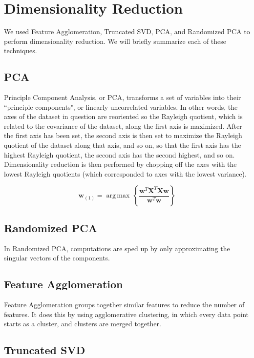 \documentclass[12pt]{article}
\begin{document}
\section{Dimensionality Reduction}

We used Feature Agglomeration, Truncated SVD, PCA, and Randomized PCA to
perform dimensionality reduction. We will briefly summarize each of these
techniques.

\subsection{PCA}

Principle Component Analysis, or PCA, transforms a set of variables into their
``principle components", or linearly uncorrelated variables. In other words,
the axes of the dataset in question are reoriented so the Rayleigh quotient,
which is related to the covariance of the dataset, along the first axis is
maximized. After the first axis has been set, the second axis is then set to
maximize the Rayleigh quotient of the dataset along that axis, and so on, so
that the first axis has the highest Rayleigh quotient, the second axis has the
second highest, and so on. Dimensionality reduction is then performed by
chopping off the axes with the lowest Rayleigh quotients (which corresponded to
axes with the lowest variance).

$$
\mathbf{w}_{(1)} = {\operatorname{\arg\,max}}\, \left\{ \frac{\mathbf{w}^T\mathbf{X}^T \mathbf{X w}}{\mathbf{w}^T \mathbf{w}} \right\}
$$


\subsection{Randomized PCA}

In Randomized PCA, computations are sped up by only approximating the singular vectors of the components.

\subsection{Feature Agglomeration}

Feature Agglomeration groups together similar features to reduce the number of
features. It does this by using agglomerative clustering, in which every data
point starts as a cluster, and clusters are merged together.

\subsection{Truncated SVD}
\end{document}
